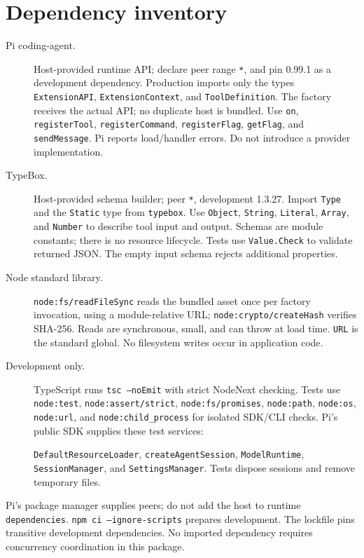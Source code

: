 \documentclass[10pt]{ltjsarticle}
\begin{document}
\section{Dependency inventory}
\begin{description}
\item[Pi coding-agent.] Host-provided runtime API; declare peer range
\texttt{*}, and pin 0.99.1 as a development dependency. Production imports only
the types \texttt{ExtensionAPI}, \texttt{ExtensionContext}, and
\texttt{ToolDefinition}. The factory receives the actual API; no duplicate
host is bundled. Use \texttt{on}, \texttt{registerTool},
\texttt{registerCommand}, \texttt{registerFlag}, \texttt{getFlag}, and
\texttt{sendMessage}. Pi reports load/handler errors. Do not introduce a
provider implementation.
\item[TypeBox.] Host-provided schema builder; peer \texttt{*}, development
1.3.27. Import \texttt{Type} and the \texttt{Static} type from \texttt{typebox}.
Use \texttt{Object}, \texttt{String}, \texttt{Literal}, \texttt{Array}, and
\texttt{Number} to describe tool input and output. Schemas are module constants;
there is no resource lifecycle. Tests use \texttt{Value.Check} to validate
returned JSON. The empty input schema rejects additional properties.
\item[Node standard library.] \texttt{node:fs/readFileSync} reads the bundled
asset once per factory invocation, using a module-relative URL;
\texttt{node:crypto/createHash} verifies SHA-256. Reads are synchronous, small,
and can throw at load time. \texttt{URL} is the standard global. No filesystem
writes occur in application code.
\item[Development only.] TypeScript runs \texttt{tsc --noEmit} with strict
NodeNext checking. Tests use \texttt{node:test}, \texttt{node:assert/strict},
\texttt{node:fs/promises}, \texttt{node:path}, \texttt{node:os},
\texttt{node:url}, and \texttt{node:child\_process} for isolated SDK/CLI checks.
Pi's public SDK supplies these test services:\par
\texttt{DefaultResourceLoader}, \texttt{createAgentSession},
\texttt{ModelRuntime}, \texttt{SessionManager}, and \texttt{SettingsManager}.
Tests dispose sessions and remove temporary files.
\end{description}
Pi's package manager supplies peers; do not add the host to runtime
\texttt{dependencies}. \texttt{npm ci --ignore-scripts} prepares development.
The lockfile pins transitive development dependencies. No imported dependency
requires concurrency coordination in this package.
\end{document}
